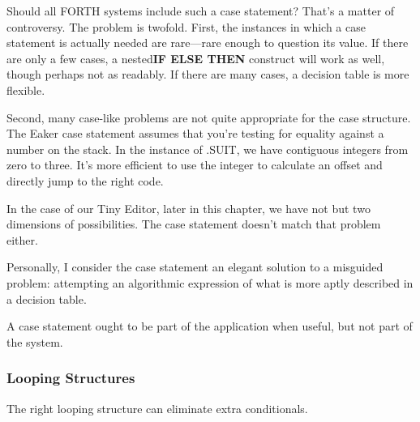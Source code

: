 Should all FORTH systems include such a case statement? That's
a matter of controversy. The problem is twofold. First, the instances in
which a case statement is actually needed are rare---rare enough to
question its value. If there are only a few cases, a nested\textbf{IF ELSE THEN}
construct will work as well, though perhaps not as readably. If there are
many cases, a decision table is more flexible.

Second, many case-like problems are not quite appropriate for the
case structure. The Eaker case statement assumes that you're testing for
equality against a number on the stack. In the instance of .SUIT, we have
contiguous integers from zero to three. It's more efficient to use the
integer to calculate an offset and directly jump to the right code.

In the case of our Tiny Editor, later in this chapter, we have not but
two dimensions of possibilities. The case statement doesn't match that
problem either.

Personally, I consider the case statement an elegant solution to a
misguided problem: attempting an algorithmic expression of what is
more aptly described in a decision table.

A case statement ought to be part of the application when useful,
but not part of the system.

\subsubsection{Looping Structures}
The right looping structure can eliminate extra conditionals.

